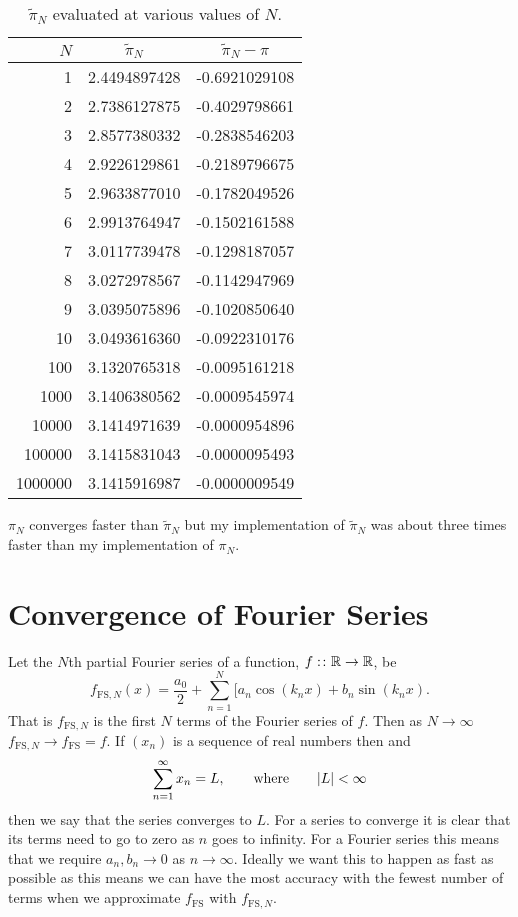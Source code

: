 \documentclass[a4paper]{article}
\newcommand{\FS}{{\mathrm{FS}}}
\begin{document}
    \begin{table}[ht]
        \centering
        \begin{tabular}{rcc}
            \hline
            \(N\) & \(\tilde{\pi}_N\) & \(\tilde{\pi}_N - \pi\)\\\hline
            1 & 2.4494897428 & -0.6921029108\\
            2 & 2.7386127875 & -0.4029798661\\
            3 & 2.8577380332 & -0.2838546203\\
            4 & 2.9226129861 & -0.2189796675\\
            5 & 2.9633877010 & -0.1782049526\\
            6 & 2.9913764947 & -0.1502161588\\
            7 & 3.0117739478 & -0.1298187057\\
            8 & 3.0272978567 & -0.1142947969\\
            9 & 3.0395075896 & -0.1020850640\\
            10 & 3.0493616360 & -0.0922310176\\
            100 & 3.1320765318 & -0.0095161218\\
            1000 & 3.1406380562 & -0.0009545974\\
            10000 & 3.1414971639 & -0.0000954896\\
            100000 & 3.1415831043 & -0.0000095493\\
            1000000 & 3.1415916987 & -0.0000009549\\\hline
        \end{tabular}
        \caption{\(\tilde{\pi}_N\) evaluated at various values of \(N\).}
        \label{tab:pi_N 2}
    \end{table}
    \(\pi_N\) converges faster than \(\tilde{\pi}_N\) but my implementation of \(\tilde{\pi}_N\) was about three times faster than my implementation of \(\pi_N\).
    
    \section{Convergence of Fourier Series}
    Let the \(N\)th partial Fourier series of a function, \(f:\colon\mathbb{R}\to\mathbb{R}\), be
    \[f_{\FS,N}(x) = \frac{a_0}{2} + \sum_{n=1}^{N}[a_n\cos(k_nx) + b_n\sin(k_nx).\]
    That is \(f_{\FS, N}\) is the first \(N\) terms of the Fourier series of \(f\).
    Then as \(N \to\infty\) \(f_{\FS,N}\to f_{\FS} = f\).
    If \((x_n)\) is a sequence of real numbers then and
    \[\sum_{n=1}^\infty x_n = L,\qquad\text{where}\qquad \abs{L} < \infty\]
    then we say that the series converges to \(L\).
    For a series to converge it is clear that its terms need to go to zero as \(n\) goes to infinity.
    For a Fourier series this means that we require \(a_n, b_n\to 0\) as \(n \to \infty\).
    Ideally we want this to happen as fast as possible as this means we can have the most accuracy with the fewest number of terms when we approximate \(f_{\FS}\) with \(f_{\FS, N}\).
    
\end{document}
